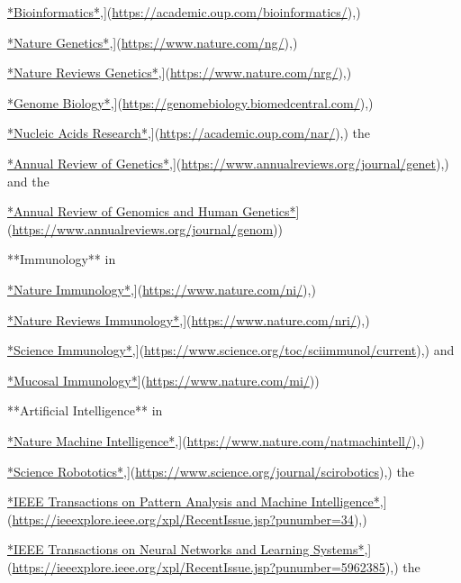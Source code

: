 \documentclass[
]{book}
\begin{document}
\href{\%5Bhttps://academic.oup.com/bioinformatics/}{*Bioinformatics*},{]}(\url{https://academic.oup.com/bioinformatics/}),)

\href{\%5Bhttps://www.nature.com/ng/}{*Nature Genetics*},{]}(\url{https://www.nature.com/ng/}),)

\href{\%5Bhttps://www.nature.com/nrg/}{*Nature Reviews Genetics*},{]}(\url{https://www.nature.com/nrg/}),)

\href{\%5Bhttps://genomebiology.biomedcentral.com/}{*Genome Biology*},{]}(\url{https://genomebiology.biomedcentral.com/}),)

\href{\%5Bhttps://academic.oup.com/nar/}{*Nucleic Acids Research*},{]}(\url{https://academic.oup.com/nar/}),) the

\href{\%5Bhttps://www.annualreviews.org/journal/genet}{*Annual Review of Genetics*},{]}(\url{https://www.annualreviews.org/journal/genet}),) and the

\href{\%5Bhttps://www.annualreviews.org/journal/genom}{*Annual Review of Genomics and Human Genetics*}{]}(\url{https://www.annualreviews.org/journal/genom}))

**Immunology** in

\href{\%5Bhttps://www.nature.com/ni/}{*Nature Immunology*},{]}(\url{https://www.nature.com/ni/}),)

\href{\%5Bhttps://www.nature.com/nri/}{*Nature Reviews Immunology*},{]}(\url{https://www.nature.com/nri/}),)

\href{\%5Bhttps://www.science.org/toc/sciimmunol/current}{*Science Immunology*},{]}(\url{https://www.science.org/toc/sciimmunol/current}),) and

\href{\%5Bhttps://www.nature.com/mi/}{*Mucosal Immunology*}{]}(\url{https://www.nature.com/mi/}))

**Artificial Intelligence** in

\href{\%5Bhttps://www.nature.com/natmachintell/}{*Nature Machine Intelligence*},{]}(\url{https://www.nature.com/natmachintell/}),)

\href{\%5Bhttps://www.science.org/journal/scirobotics}{*Science Robototics*},{]}(\url{https://www.science.org/journal/scirobotics}),) the

\href{\%5Bhttps://ieeexplore.ieee.org/xpl/RecentIssue.jsp?punumber=34}{*IEEE Transactions on Pattern Analysis and Machine Intelligence*},{]}(\url{https://ieeexplore.ieee.org/xpl/RecentIssue.jsp?punumber=34}),)

\href{\%5Bhttps://ieeexplore.ieee.org/xpl/RecentIssue.jsp?punumber=5962385}{*IEEE Transactions on Neural Networks and Learning Systems*},{]}(\url{https://ieeexplore.ieee.org/xpl/RecentIssue.jsp?punumber=5962385}),) the
\end{document}
